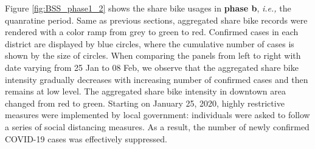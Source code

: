 \documentclass[ijgi,submit,moreauthors,pdftex]{Definitions/mdpi}
\begin{document}
Figure \ref{fig:BSS_phase1_2} shows the share bike usages in \textbf{phase b}, \textit{i.e.,} the quanratine period.
Same as previous sections, aggregated share bike records were rendered with a color ramp from grey to green to red.
Confirmed cases in each district are displayed by blue circles, where the cumulative number of cases is shown by the size of circles.
When comparing the panels from left to right with date varying from 25 Jan to 08 Feb, we observe that the aggregated share bike intensity gradually decreases with increasing number of confirmed cases and then remains at low level.
The aggregated share bike intensity in downtown area changed from red to green.
Starting on January 25, 2020, highly restrictive measures were implemented by local government: individuals were asked to follow a series of social distancing measures.
As a result, the number of newly confirmed COVID-19 cases was effectively suppressed.
\end{document}
